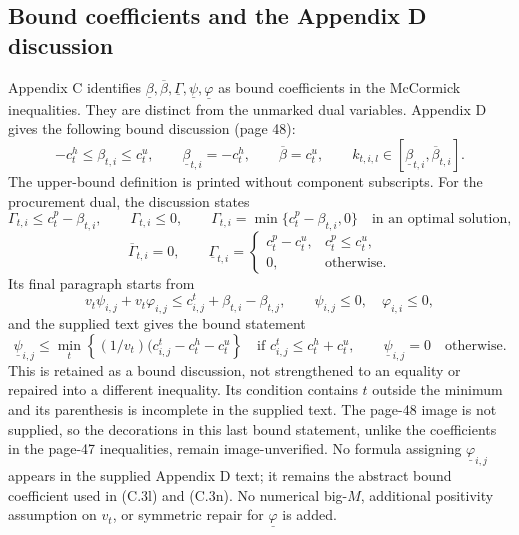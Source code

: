 \documentclass{article}
\begin{document}
\subsection*{Bound coefficients and the Appendix D discussion}
Appendix C identifies $\underline\beta,\overline\beta,
\underline\Gamma,\underline\psi,\underline\varphi$ as bound coefficients in the
McCormick inequalities. They are distinct from the unmarked dual variables.
Appendix D gives the following bound discussion (page 48):
\[
-c_t^h\leq\beta_{t,i}\leq c_t^u,\qquad
\underline\beta_{t,i}=-c_t^h,\qquad \overline\beta=c_t^u,
\qquad k_{t,i,l}\in[\underline\beta_{t,i},\overline\beta_{t,i}].
\]
The upper-bound definition is printed without component subscripts. For the procurement
dual, the discussion states
\[
\Gamma_{t,i}\leq c_t^p-\beta_{t,i},\qquad \Gamma_{t,i}\leq0,
\qquad \Gamma_{t,i}=\min\{c_t^p-\beta_{t,i},0\}
\quad\text{in an optimal solution},
\]
\[
\overline\Gamma_{t,i}=0,\qquad
\underline\Gamma_{t,i}=
\begin{cases}
c_t^p-c_t^u,&c_t^p\leq c_t^u,\\
0,&\text{otherwise}.
\end{cases}
\]
Its final paragraph starts from
\[
v_t\psi_{i,j}+v_t\varphi_{i,j}\leq c^t_{i,j}+\beta_{t,i}-\beta_{t,j},
\qquad \psi_{i,j}\leq0,\quad\varphi_{i,i}\leq0,
\]
and the supplied text gives the bound statement
\[
\underline\psi_{i,j}\leq
\min_t\left\{(1/v_t)(c^t_{i,j}-c_t^h-c_t^u\right\}
\quad\text{if }c^t_{i,j}\leq c_t^h+c_t^u,
\qquad \underline\psi_{i,j}=0\quad\text{otherwise}.
\]
This is retained as a bound discussion, not strengthened to an equality or repaired
into a different inequality. Its condition contains $t$ outside the minimum and
its parenthesis is incomplete in the supplied text. The page-48 image is not supplied,
so the decorations in this last bound statement, unlike the coefficients in the
page-47 inequalities, remain image-unverified. No formula assigning
$\underline\varphi_{i,j}$ appears in the supplied Appendix D text; it remains the
abstract bound coefficient used in (C.3l) and (C.3n). No numerical big-$M$, additional
positivity assumption on $v_t$, or symmetric repair for $\underline\varphi$ is added.
\end{document}
